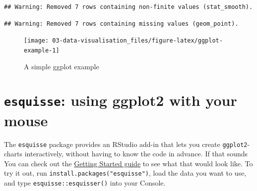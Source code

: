 \documentclass[
]{book}
\newenvironment{Shaded}{\begin{snugshade}}{\end{snugshade}}
\newcommand{\DataTypeTok}[1]{\textcolor[rgb]{0.13,0.29,0.53}{#1}}
\newcommand{\DecValTok}[1]{\textcolor[rgb]{0.00,0.00,0.81}{#1}}
\newcommand{\KeywordTok}[1]{\textcolor[rgb]{0.13,0.29,0.53}{\textbf{#1}}}
\newcommand{\NormalTok}[1]{#1}
\newcommand{\OperatorTok}[1]{\textcolor[rgb]{0.81,0.36,0.00}{\textbf{#1}}}
\newcommand{\StringTok}[1]{\textcolor[rgb]{0.31,0.60,0.02}{#1}}
\begin{document}
\begin{Shaded}
\end{Shaded}

\begin{verbatim}
## Warning: Removed 7 rows containing non-finite values (stat_smooth).
\end{verbatim}

\begin{verbatim}
## Warning: Removed 7 rows containing missing values (geom_point).
\end{verbatim}

\begin{figure}

{\centering \texttt{[image: 03-data-visualisation\_files/figure-latex/ggplot-example-1]} 

}

\caption{A simple ggplot example}\label{fig:ggplot-example}
\end{figure}

\hypertarget{esquisse-using-ggplot2-with-your-mouse}{%
\section{\texorpdfstring{\texttt{esquisse}: using ggplot2 with your mouse}{esquisse: using ggplot2 with your mouse}}\label{esquisse-using-ggplot2-with-your-mouse}}

The \texttt{esquisse} package provides an RStudio add-in that lets you create \texttt{ggplot2}-charts interactively, without having to know the code in advance. If that sounds You can check out the \href{https://dreamrs.github.io/esquisse/articles/get-started.html}{Getting Started guide} to see what that would look like. To try it out, run \texttt{install.packages("esquisse")}, load the data you want to use, and type \texttt{esquisse::esquisser()} into your Console.
\end{document}
